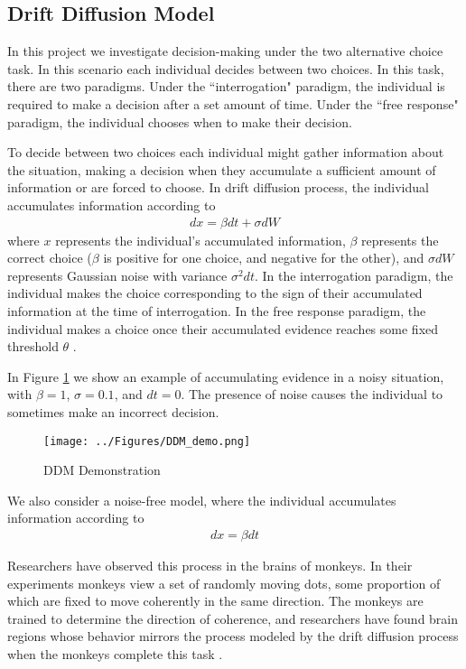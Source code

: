 \documentclass[pageno]{jpaper}
\begin{document}
\subsection{Drift Diffusion Model}
In this project we investigate decision-making under the two alternative choice task. In this scenario each individual decides between two choices. In this task, there are two paradigms. Under the ``interrogation" paradigm, the individual is required to make a decision after a set amount of time. Under the ``free response" paradigm, the individual chooses when to make their decision.

To decide between two choices each individual might gather information about the situation, making a decision when they accumulate a sufficient amount of information or are forced to choose. In drift diffusion process, the individual accumulates information according to
\begin{align}
dx=\beta dt+\sigma dW
\end{align}
where $x$ represents the individual's accumulated information, $\beta$ represents the correct choice ($\beta$ is positive for one choice, and negative for the other), and $\sigma dW$ represents Gaussian noise with variance $\sigma^2dt$. In the interrogation paradigm, the individual makes the choice corresponding to the sign of their accumulated information at the time of interrogation. In the free response paradigm, the individual makes a choice once their accumulated evidence reaches some fixed threshold $\theta$ \cite{bogacz_physics_2006}.

In Figure \ref{fig:DDM_demo} we show an example of accumulating evidence in a noisy situation, with $\beta=1$, $\sigma=0.1$, and $dt=0$. The presence of noise causes the individual to sometimes make an incorrect decision.

\begin{figure}[ht]
\centering
	\texttt{[image: ../Figures/DDM\_demo.png]}
\caption{DDM Demonstration}
\label{fig:DDM_demo}
\end{figure}

We also consider a noise-free model, where the individual accumulates information according to
\begin{align}
dx=\beta dt
\end{align}

Researchers have observed this process in the brains of monkeys. In their experiments monkeys view a set of randomly moving dots, some proportion of which are fixed to move coherently in the same direction. The monkeys are trained to determine the direction of coherence, and researchers have found brain regions whose behavior mirrors the process modeled by the drift diffusion process when the monkeys complete this task \cite{shadlen_neural_2001}.
\end{document}
